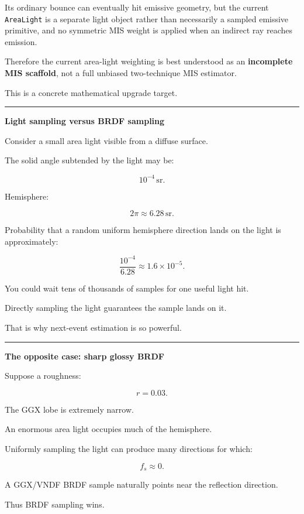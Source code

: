 Its ordinary bounce can eventually hit emissive geometry, but the current \texttt{AreaLight} is a separate light object rather than necessarily a sampled emissive primitive, and no symmetric MIS weight is applied when an indirect ray reaches emission.

Therefore the current area-light weighting is best understood as an \textbf{incomplete MIS scaffold}, not a full unbiased two-technique MIS estimator.

This is a concrete mathematical upgrade target.

\begin{center}\rule{0.5\linewidth}{0.5pt}\end{center}

\textbf{Light sampling versus BRDF sampling}

Consider a small area light visible from a diffuse surface.

The solid angle subtended by the light may be:

\[
10^{-4}\,\text{sr}.
\]

Hemisphere:

\[
2\pi\approx6.28\,\text{sr}.
\]

Probability that a random uniform hemisphere direction lands on the light is approximately:

\[
\frac{10^{-4}}{6.28}
\approx1.6\times10^{-5}.
\]

You could wait tens of thousands of samples for one useful light hit.

Directly sampling the light guarantees the sample lands on it.

That is why next-event estimation is so powerful.

\begin{center}\rule{0.5\linewidth}{0.5pt}\end{center}

\textbf{The opposite case: sharp glossy BRDF}

Suppose a roughness:

\[
r=0.03.
\]

The GGX lobe is extremely narrow.

An enormous area light occupies much of the hemisphere.

Uniformly sampling the light can produce many directions for which:

\[
f_s\approx0.
\]

A GGX/VNDF BRDF sample naturally points near the reflection direction.

Thus BRDF sampling wins.

